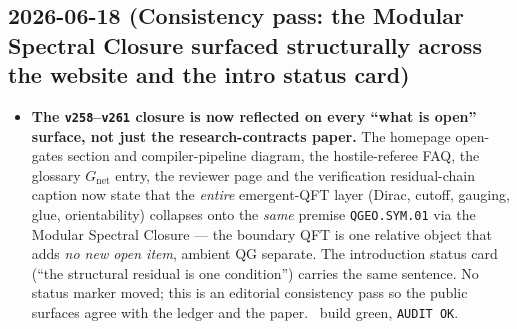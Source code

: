 \subsection*{2026-06-18 (Consistency pass: the Modular Spectral Closure surfaced structurally across the website and the intro status card)}
\begin{itemize}
\item \textbf{The \texttt{v258}--\texttt{v261} closure is now reflected on every ``what is open'' surface, not just the
  research-contracts paper.} The homepage open-gates section and compiler-pipeline diagram, the hostile-referee
  FAQ, the glossary $G_{\mathrm{net}}$ entry, the reviewer page and the verification residual-chain caption now
  state that the \emph{entire} emergent-QFT layer (Dirac, cutoff, gauging, glue, orientability) collapses onto
  the \emph{same} premise \texttt{QGEO.SYM.01} via the Modular Spectral Closure --- the boundary QFT is one
  relative object that adds \emph{no new open item}, ambient QG separate. The introduction status card
  (``the structural residual is one condition'') carries the same sentence. No status marker moved; this is an
  editorial consistency pass so the public surfaces agree with the ledger and the paper. \mE\ build green,
  \texttt{AUDIT OK}.
\end{itemize}

